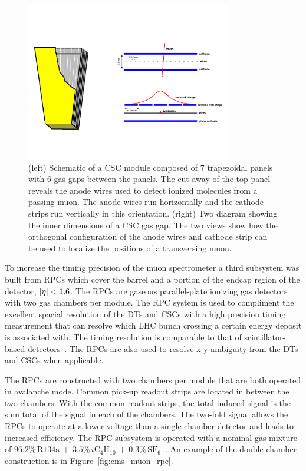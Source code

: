 \begin{figure}[htbp]
\centering
     \includegraphics[width=0.8\textwidth]{cms_and_lhc/plots/cms_muon_csc2.pdf}
     \caption{
(left) Schematic of a CSC module composed of 7 trapezoidal panels with 6 gas gaps between
the panels. The cut away of the top panel reveals the anode wires used to 
detect ionized molecules from a passing muon. The anode wires run horizontally and 
the cathode strips run vertically in this orientation.
(right) Two diagram showing the inner dimensions of a CSC gas gap. The two views
show how the orthogonal configuration of the anode wires and cathode strip can be used
to localize the positions of a transversing muon.
     }
     \label{fig:cms_muon_csc}
\end{figure}

To increase the timing precision of the muon spectrometer a third subsystem was
built from RPCs which cover the barrel and a portion of the endcap
region of the detector, $\lvert\eta\rvert < 1.6$. The RPCs are gaseous parallel-plate ionizing gas 
detectors with two gas chambers per module. The RPC system is used to compliment the excellent spacial resolution of the
DTs and CSCs with a high precision timing measurement that can resolve which LHC bunch
crossing a certain energy deposit is associated with. The timing resolution is comparable
to that of scintillator-based detectors~\cite{rpc_dev}. The RPCs are also used to 
resolve x-y ambiguity from the DTs and CSCs when applicable.

The RPCs are constructed with two chambers per module that are both operated in avalanche mode.
Common pick-up readout strips are located in between the two chambers. With the common
 readout strips, the total induced signal is the sum total of the signal in each of the
chambers. The two-fold signal allows the RPCs to operate at a lower voltage than a single
chamber detector and leads to increased efficiency. 
The RPC subsystem is operated with a nominal gas mixture of 
$96.2\% \, \textrm{R134a} \, + \, 3.5\% \, i\textrm{C}_{4}\textrm{H}_{10} \, + \, 0.3\% \, \textrm{SF}_{6}$~\cite{CMS-Proposal}.
An example of the
double-chamber construction is in Figure~\ref{fig:cms_muon_rpc}.

